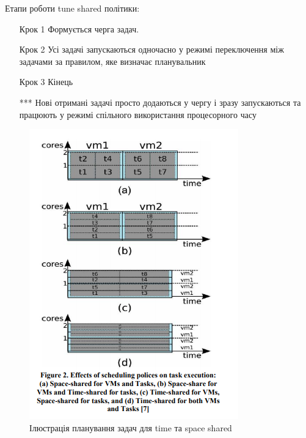 Етапи роботи tune shared політики:
\begin{itemize}
	\item[Крок 1] Формується черга задач.
	\item[Крок 2] Усі задачі запускаються одночасно у режимі переключення між задачами за правилом, яке визначає планувальник
	\item[Крок 3] Кінець
	\item[***] Нові отримані задачі просто додаються у чергу і зразу запускаються та працюють у режимі спільного використання процесорного часу
\end{itemize}

\begin{figure}[H]
	\centering
	\includegraphics[width=\textwidth]{task_analysis/img/time_space_shared}
	\caption{Ілюстрація планування задач для time та space shared }
	\label{fig:time_space_shared}
\end{figure}

